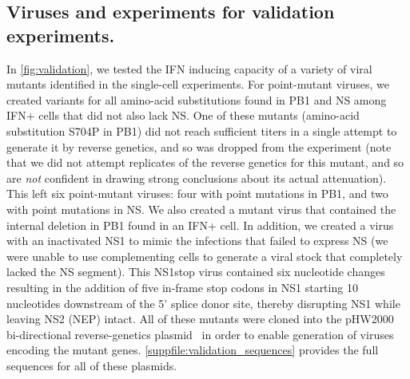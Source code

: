 \documentclass[lineno]{asm-article}
\newcommand{\FIG}[1]{\autoref{fig:#1}}
\newcommand{\SUPPFILE}[1]{\autoref{suppfile:#1}}
\begin{document}
\subsection{Viruses and experiments for validation experiments.}
In \FIG{validation}, we tested the IFN inducing capacity of a variety of viral mutants identified in the single-cell experiments.
For point-mutant viruses, we created variants for all amino-acid substitutions found in PB1 and NS among IFN+ cells that did not also lack NS.
One of these mutants (amino-acid substitution S704P in PB1) did not reach sufficient titers in a single attempt to generate it by reverse genetics, and so was dropped from the experiment (note that we did not attempt replicates of the reverse genetics for this mutant, and so are \emph{not} confident in drawing strong conclusions about its actual attenuation).
This left six point-mutant viruses: four with point mutations in PB1, and two with point mutations in NS.
We also created a mutant virus that contained the internal deletion in PB1 found in an IFN+ cell.
In addition, we created a virus with an inactivated NS1 to mimic the infections that failed to express NS (we were unable to use complementing cells to generate a viral stock that completely lacked the NS segment).
This NS1stop virus contained six nucleotide changes resulting in the addition of five in-frame stop codons in NS1 starting 10 nucleotides downstream of the 5' splice donor site, thereby disrupting NS1 while leaving NS2 (NEP) intact.
All of these mutants were cloned into the pHW2000 bi-directional reverse-genetics plasmid~\cite{hoffmann2000dna} in order to enable generation of viruses encoding the mutant genes.
 \SUPPFILE{validation_sequences} provides the full sequences for all of these plasmids.
\end{document}
